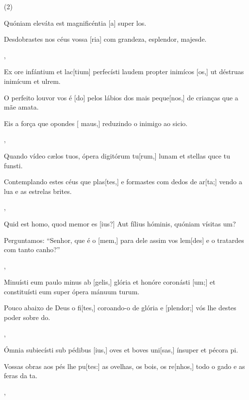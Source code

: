 \SetVersePairs(2){
    {\item {}Quóniam eleváta est magnificéntia [a] super \-los.~\Responsorium}%
        {\item {}Desdobrastes nos céus vossa [ria] com grandeza, esplendor, majesde.~\Responsorium},
    {\item {}Ex ore infántium et lac[tium] perfecísti laudem propter inimícos [os,] ut déstruas inimícum et ul\-\-rem.~\Responsorium}%
        {\item {}O perfeito louvor vos é [do] pelos lábios dos mais peque[nos,] de crianças que a mãe ama\-ta.~\Responsorium
            \item {}Eis a força que opondes [ maus,] reduzindo o inimigo ao sicio.~\Responsorium},
    {\item {}Quando vídeo cælos tuos, ópera digitórum tu[\-rum,] lunam et stellas quce tu funsti.~\Responsorium}%
        {\item {}Contemplando estes céus que plas[tes,] e formastes com dedos de ar[ta;] vendo a lua e as estrelas brites.~\Responsorium},
    {\item {}Quid est homo, quod memor es [ius?] Aut fílius hóminis, quóniam vísitas um?~\Responsorium}%
        {\item {}Perguntamos: “Senhor, que é o [mem,] para dele assim vos lem[des] e o tratardes com tanto canho?''~\Responsorium},
    {\item {}Minuísti eum paulo minus ab [gelis,] glória et honóre coronásti [um;] et constituísti eum super ópera mánuum turum.~\Responsorium}%
        {\item {}Pouco abaixo de Deus o fi[tes,] coroando-o de glória e [plendor;] vós lhe destes poder sobre do.~\Responsorium},
    {\item {}Ómnia subiecísti sub pédibus [ius,] oves et boves uni[\-sas,] ínsuper et pécora pi.~\Responsorium}%
        {\item {}Vossas obras aos pés lhe pu[tes:] as ovelhas, os bois, os re[nhos,] todo o gado e as feras da ta.~\Responsorium},
}
